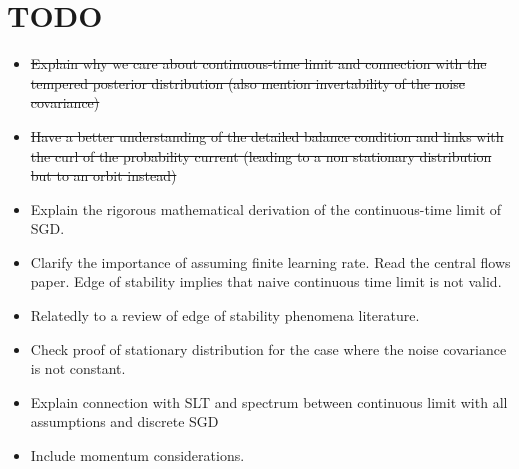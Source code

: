\documentclass[11pt]{article}
\begin{document}
\section{\textbf{TODO}}
\begin{itemize}
    \item \sout{Explain why we care about continuous-time limit and connection with the tempered posterior distribution (also mention invertability of the noise covariance)}
    \item \sout{Have a better understanding of the detailed balance condition and links with the curl of the probability current (leading to a non stationary distribution but to an orbit instead)}
    \item Explain the rigorous mathematical derivation of the continuous-time limit of SGD.
    \item Clarify the importance of assuming finite learning rate. Read the central flows paper. Edge of stability implies that naive continuous time limit is not valid.
    \item Relatedly to a review of edge of stability phenomena literature.
    \item Check proof of stationary distribution for the case where the noise covariance is not constant.
    \item Explain connection with SLT and spectrum between continuous limit with all assumptions and discrete SGD
    \item Include momentum considerations.
\end{itemize}
\end{document}
